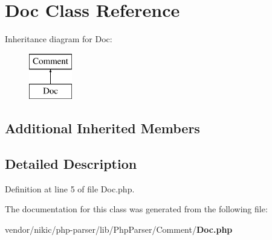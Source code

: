 \section{Doc Class Reference}
\label{class_php_parser_1_1_comment_1_1_doc}
Inheritance diagram for Doc\+:\begin{figure}[H]
\begin{center}
\leavevmode
\includegraphics[height=2.000000cm]{class_php_parser_1_1_comment_1_1_doc}
\end{center}
\end{figure}
\subsection*{Additional Inherited Members}


\subsection{Detailed Description}


Definition at line 5 of file Doc.\+php.



The documentation for this class was generated from the following file\+:\begin{DoxyCompactItemize}
\item 
vendor/nikic/php-\/parser/lib/\+Php\+Parser/\+Comment/{\bf Doc.\+php}\end{DoxyCompactItemize}
